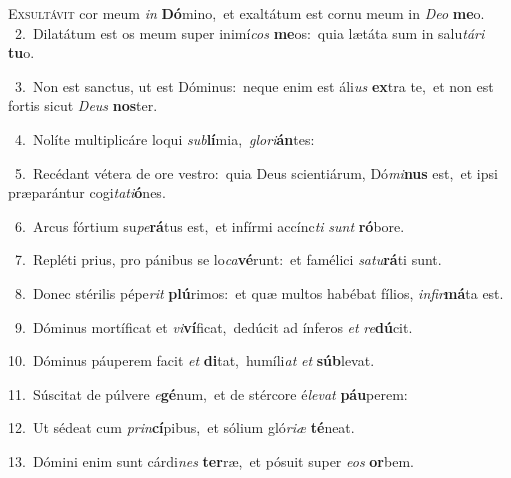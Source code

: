 \lettrine{\initial\textcolor{\initialcolor}{E}}{xsultávit} cor meum \textit{in} \textbf{Dó}\-mino,~\star et exaltátum est cornu meum in \textit{De}\-\textit{o} \textbf{me}\-o.\\
{\numbfont\textcolor{\numbcolor}{~2.}}~Dilatátum est os meum super inimí\textit{cos} \textbf{me}\-os:~\star quia lætáta sum in salu\-\textit{tá}\-\textit{ri} \textbf{tu}\-o.\par
{\numbfont\textcolor{\numbcolor}{~3.}}~Non est sanctus, ut est Dóminus:~\dagger neque enim est áli\textit{us} \textbf{ex}\-tra te,~\star et non est fortis sicut \textit{De}\-\textit{us} \textbf{nos}\-ter.\par
{\numbfont\textcolor{\numbcolor}{~4.}}~Nolíte multiplicáre loqui \textit{sub}\-\textbf{lí}mia,~\star \textit{glo}\-\textit{ri}\textbf{án}tes:\par
{\numbfont\textcolor{\numbcolor}{~5.}}~Recédant vétera de ore vestro:~\dagger quia Deus scientiárum, Dó\-\textit{mi}\-\textbf{nus} est,~\star et ipsi præparántur cogi\-\textit{ta}\-\textit{ti}\textbf{ó}nes.\par
{\numbfont\textcolor{\numbcolor}{~6.}}~Arcus fórtium su\-\textit{pe}\-\textbf{rá}tus est,~\star et infírmi accínc\textit{ti} \textit{sunt} \textbf{ró}\-bore.\par
{\numbfont\textcolor{\numbcolor}{~7.}}~Repléti prius, pro pánibus se lo\-\textit{ca}\-\textbf{vé}runt:~\star et famélici \textit{sa}\-\textit{tu}\textbf{rá}ti sunt.\par
{\numbfont\textcolor{\numbcolor}{~8.}}~Donec stérilis pépe\textit{rit} \textbf{plú}\-rimos:~\star et quæ multos habébat fílios, \textit{in}\-\textit{fir}\textbf{má}ta est.\par
{\numbfont\textcolor{\numbcolor}{~9.}}~Dóminus mortíficat et \textit{vi}\-\textbf{ví}ficat,~\star dedúcit ad ínferos \textit{et} \textit{re}\-\textbf{dú}cit.\par
{\numbfont\textcolor{\numbcolor}{10.}}~Dóminus páuperem facit \textit{et} \textbf{di}\-tat,~\star humíli\textit{at} \textit{et} \textbf{súb}\-levat.\par
{\numbfont\textcolor{\numbcolor}{11.}}~Súscitat de púlvere \textit{e}\-\textbf{gé}num,~\star et de stércore é\-\textit{le}\-\textit{vat} \textbf{páu}\-perem:\par
{\numbfont\textcolor{\numbcolor}{12.}}~Ut sédeat cum \textit{prin}\-\textbf{cí}pibus,~\star et sólium gló\-\textit{ri}\-\textit{æ} \textbf{té}\-neat.\par
{\numbfont\textcolor{\numbcolor}{13.}}~Dómini enim sunt cárdi\textit{nes} \textbf{ter}\-ræ,~\star et pósuit super \textit{e}\-\textit{os} \textbf{or}\-bem.\par
